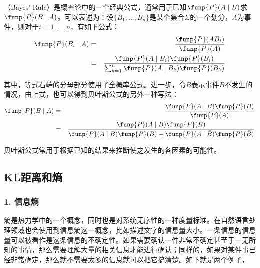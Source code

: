 （Bayes' Rule）是概率论中的一个经典公式，通常用于已知$\funp{P}(A \mid B)$求$\funp{P}(B \mid A)$。可以表述为：设$\{B_1, \ldots ,B_n\}$是某个集合$\Sigma$的一个划分，$A$为事件，则对于$i=1, \ldots ,n$，有如下公式：
\begin{eqnarray}
\funp{P}(B_i \mid A) & = & \frac {\funp{P}(A  B_i)} { \funp{P}(A) } \nonumber \\
                                   & = & \frac {\funp{P}(A \mid B_i)\funp{P}(B_i) } { \sum_{k=1}^n\funp{P}(A \mid B_k)\funp{P}(B_k) }
\label{eq:2-11}
\end{eqnarray}

\noindent 其中，等式右端的分母部分使用了全概率公式。进一步，令$\bar{B}$表示事件$B$不发生的情况，由上式，也可以得到贝叶斯公式的另外一种写法：
\begin{eqnarray}
\funp{P}(B \mid A) & = & \frac { \funp{P}(A \mid B)\funp{P}(B) }  {\funp{P}(A)} \nonumber \\
                     & = & \frac { \funp{P}(A \mid B)\funp{P}(B) }  {\funp{P}(A \mid B)\funp{P}(B)+\funp{P}(A \mid \bar{B}) \funp{P}(\bar{B})}
\label{eq:2-12}
\end{eqnarray}

\parinterval 贝叶斯公式常用于根据已知的结果来推断使之发生的各因素的可能性。


\subsection{KL距离和熵}


\subsubsection{1. 信息熵}

\parinterval 熵是热力学中的一个概念，同时也是对系统无序性的一种度量标准。在自然语言处理领域也会使用到信息熵这一概念，比如描述文字的信息量大小。一条信息的信息量可以被看作是这条信息的不确定性。如果需要确认一件非常不确定甚至于一无所知的事情，那么需要理解大量的相关信息才能进行确认；同样的，如果对某件事已经非常确定，那么就不需要太多的信息就可以把它搞清楚。如下就是两个例子，

